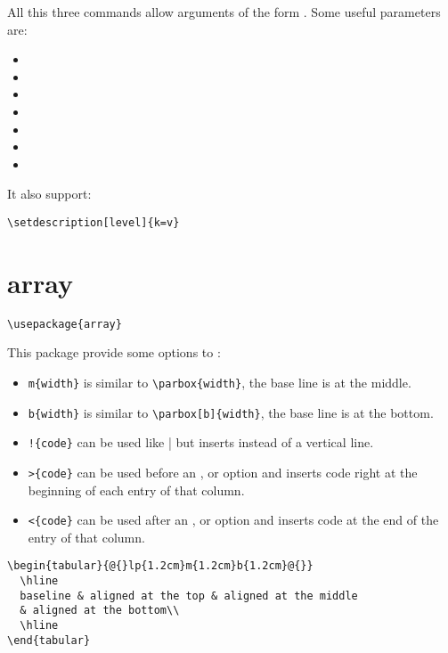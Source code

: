 All this three commands allow arguments of the form .
Some useful parameters are:
\begin{itemize}
\item {}
\item {}
\item {}
\item {}
\item {}
\item {}
\item {}
\end{itemize}


It also support:
\begin{lstlisting}
\setdescription[level]{k=v}
\end{lstlisting}



\section{array}
\label{sec:array}
\begin{lstlisting}
\usepackage{array}
\end{lstlisting}

This package provide some options to :
\begin{itemize}
\item \lstinline|m{width}| is similar to \lstinline|\parbox{width}|, the base line is at the middle.
\item \lstinline|b{width}| is similar to \lstinline|\parbox[b]{width}|, the base line is at the bottom.
\item \lstinline|!{code}| can be used like | but inserts  instead of a vertical line.
\item \lstinline|>{code}| can be used before an , or  option and inserts code right at the beginning of each entry of that column.
\item \lstinline|<{code}| can be used after an , or  option and inserts code at the end of the entry of that column.
\end{itemize}


\begin{lstlisting}
\begin{tabular}{@{}lp{1.2cm}m{1.2cm}b{1.2cm}@{}}
  \hline
  baseline & aligned at the top & aligned at the middle 
  & aligned at the bottom\\
  \hline
\end{tabular}

\end{lstlisting}

